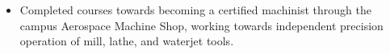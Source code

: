 \begin{tcolorbox}
\begin{minipage}[t]{0.825\textwidth}
\begin{tcolorbox}[grow to right by=0.95cm,height=0.85\textheight,colframe=white,colback=white]
{\begin{itemize}
                            \item Completed courses towards becoming a certified machinist through the campus Aerospace Machine Shop, working towards independent precision operation of mill, lathe, and waterjet tools.
                            
                        \end{itemize}}

                    \vspace{1em}

                    
                
                    
    
    
    
    
    


\end{tcolorbox}
\end{minipage}
\end{tcolorbox}
